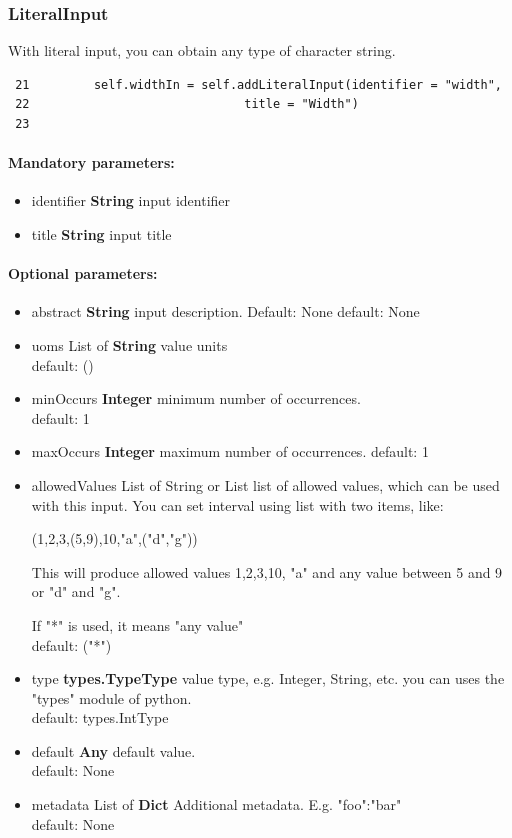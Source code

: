 \documentclass[a4paper,11pt]{report}
\begin{document}
\subsubsection{LiteralInput}

With literal input, you can obtain any type of character string.

\begin{verbatim}
 21         self.widthIn = self.addLiteralInput(identifier = "width",
 22                              title = "Width")
 23 
\end{verbatim}

\paragraph{Mandatory parameters:}
\begin{itemize}
\item identifier \textbf{String} input identifier
\item title \textbf{String} input title
\end{itemize}

\paragraph{Optional parameters:}
\begin{itemize}
\item abstract \textbf{String} input description. Default: None
            default: None\\
\item uoms List of \textbf{String} value units\\
            default: ()
\item minOccurs \textbf{Integer} minimum number of occurrences.\\
            default: 1
\item maxOccurs \textbf{Integer} maximum number of occurrences.
            default: 1\\
\item allowedValues  List of {String} or {List} list of allowed values,
            which can be used with this input. You can set interval
            using list with two items, like:

            (1,2,3,(5,9),10,"a",("d","g"))

            This will produce allowed values 1,2,3,10, "a" and
            any value between 5 and 9 or "d" and "g".

            If "*" is used, it means "any value"\\
            default: ("*")
\item type \textbf{types.TypeType} value type, e.g. Integer, String, etc. you
            can uses the "types" module of python.\\
            default: types.IntType
\item default \textbf{Any} default value.\\
            default: None
\item metadata List of \textbf{Dict} Additional metadata. E.g.  {"foo":"bar"}\\
            default: None
\end{itemize}
\end{document}
